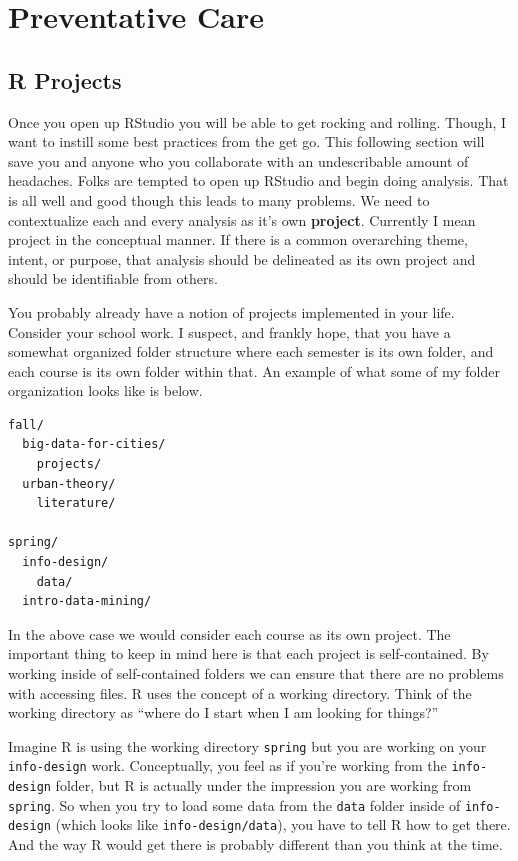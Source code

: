 \documentclass[
]{book}
\begin{document}
\hypertarget{preventative-care}{%
\section{Preventative Care}\label{preventative-care}}

\hypertarget{r-projects}{%
\subsection{R Projects}\label{r-projects}}

Once you open up RStudio you will be able to get rocking and rolling. Though, I want to instill some best practices from the get go. This following section will save you and anyone who you collaborate with an undescribable amount of headaches.
Folks are tempted to open up RStudio and begin doing analysis. That is all well and good though this leads to many problems. We need to contextualize each and every analysis as it's own \textbf{project}. Currently I mean project in the conceptual manner. If there is a common overarching theme, intent, or purpose, that analysis should be delineated as its own project and should be identifiable from others.

You probably already have a notion of projects implemented in your life. Consider your school work. I suspect, and frankly hope, that you have a somewhat organized folder structure where each semester is its own folder, and each course is its own folder within that. An example of what some of my folder organization looks like is below.

\begin{verbatim}
fall/
  big-data-for-cities/
    projects/
  urban-theory/
    literature/
  
spring/
  info-design/
    data/
  intro-data-mining/
\end{verbatim}

In the above case we would consider each course as its own project. The important thing to keep in mind here is that each project is self-contained. By working inside of self-contained folders we can ensure that there are no problems with accessing files. R uses the concept of a working directory. Think of the working directory as ``where do I start when I am looking for things?''

Imagine R is using the working directory \texttt{spring} but you are working on your \texttt{info-design} work. Conceptually, you feel as if you're working from the \texttt{info-design} folder, but R is actually under the impression you are working from \texttt{spring}. So when you try to load some data from the \texttt{data} folder inside of \texttt{info-design} (which looks like \texttt{info-design/data}), you have to tell R how to get there. And the way R would get there is probably different than you think at the time.
\end{document}
